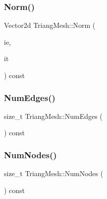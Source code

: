 \mbox{\label{structTriangMesh_a630364be0304888840c6d231f5111695}} 
\subsubsection{\texorpdfstring{Norm()}{Norm()}}
{\footnotesize\ttfamily Vector2d Triang\+Mesh\+::\+Norm (\begin{DoxyParamCaption}\item[{\hyperlink{structTriangMesh_a9883abab211497b807f24e6e46f4b8f6}{Node\+Tag}}]{ie,  }\item[{\hyperlink{structTriangMesh_a9883abab211497b807f24e6e46f4b8f6}{Node\+Tag}}]{it }\end{DoxyParamCaption}) const}

\mbox{\label{structTriangMesh_a058b662444a7cf9e3eaddb4c88886951}} 
\subsubsection{\texorpdfstring{Num\+Edges()}{NumEdges()}}
{\footnotesize\ttfamily size\+\_\+t Triang\+Mesh\+::\+Num\+Edges (\begin{DoxyParamCaption}{ }\end{DoxyParamCaption}) const\hspace{0.3cm}{\ttfamily [inline]}}

\mbox{\label{structTriangMesh_ac936e752bedb743c50575c34cdc67d3b}} 
\subsubsection{\texorpdfstring{Num\+Nodes()}{NumNodes()}}
{\footnotesize\ttfamily size\+\_\+t Triang\+Mesh\+::\+Num\+Nodes (\begin{DoxyParamCaption}{ }\end{DoxyParamCaption}) const\hspace{0.3cm}{\ttfamily [inline]}}

\mbox{\label{structTriangMesh_a87e9011fee83643dd2b28cadf0116f06}} 
